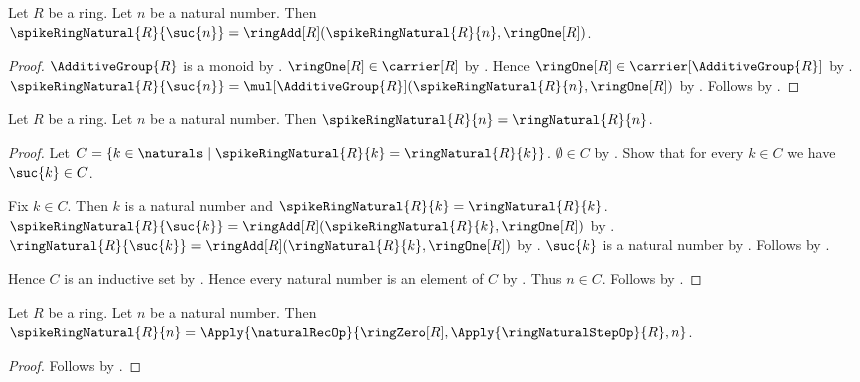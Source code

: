 \begin{proposition}\label{spike16_ring_natural_successor}
    Let $R$ be a ring.
    Let $n$ be a natural number.
    Then $\spikeRingNatural{R}{\suc{n}}
        =\ringAdd[R](\spikeRingNatural{R}{n},\ringOne[R])$.
\end{proposition}
\begin{proof}
    $\AdditiveGroup{R}$ is a monoid by
        .
    $\ringOne[R]\in\carrier[R]$ by .
    Hence $\ringOne[R]\in\carrier[\AdditiveGroup{R}]$
        by .
    $\spikeRingNatural{R}{\suc{n}}
        =\mul[\AdditiveGroup{R}](
            \spikeRingNatural{R}{n},\ringOne[R])$
        by .
    Follows by .
\end{proof}

\begin{theorem}\label{spike16_ring_natural_new_body_eq_old}
    Let $R$ be a ring.
    Let $n$ be a natural number.
    Then $\spikeRingNatural{R}{n}=\ringNatural{R}{n}$.
\end{theorem}
\begin{proof}
    Let $C=\{k\in\naturals\mid
        \spikeRingNatural{R}{k}=\ringNatural{R}{k}\}$.
    $\emptyset\in C$ by
        .
    Show that for every $k\in C$ we have $\suc{k}\in C$.
    \begin{subproof}
        Fix $k\in C$.
        Then $k$ is a natural number and
            $\spikeRingNatural{R}{k}=\ringNatural{R}{k}$.
        $\spikeRingNatural{R}{\suc{k}}
            =\ringAdd[R](\spikeRingNatural{R}{k},\ringOne[R])$
            by .
        $\ringNatural{R}{\suc{k}}
            =\ringAdd[R](\ringNatural{R}{k},\ringOne[R])$
            by .
        $\suc{k}$ is a natural number by .
        Follows by \auto.
    \end{subproof}
    Hence $C$ is an inductive set by .
    Hence every natural number is an element of $C$
        by .
    Thus $n\in C$.
    Follows by \auto.
\end{proof}

\begin{theorem}\label{spike16_ring_natural_recursion_eq}
    Let $R$ be a ring.
    Let $n$ be a natural number.
    Then $\spikeRingNatural{R}{n}
        =\Apply{\naturalRecOp}{\ringZero[R],
            \Apply{\ringNaturalStepOp}{R},n}$.
\end{theorem}
\begin{proof}
    Follows by
        .
\end{proof}
